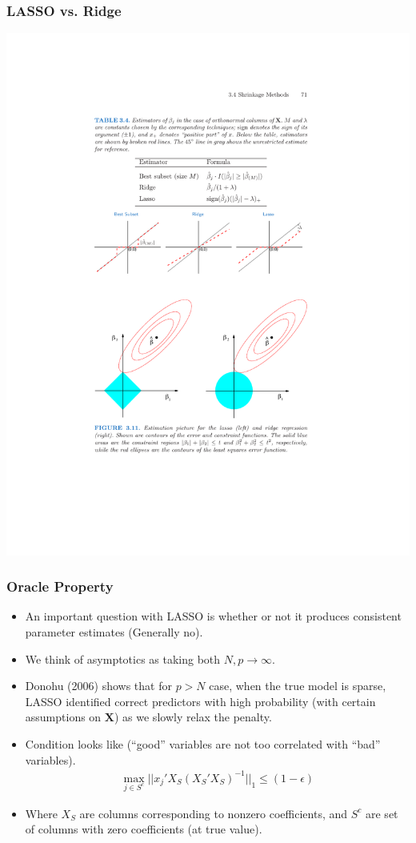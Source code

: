 \begin{frame}
\frametitle{LASSO vs. Ridge}
\begin{center}
\includegraphics[height=0.85\textheight]{./resources/orthcompare}
\end{center}
\end{frame}


\begin{frame}
    \frametitle{Oracle Property}
    \begin{itemize}
    \item An important question with LASSO is whether or not it produces consistent parameter estimates (Generally \alert{no}).
    \item We think of asymptotics as taking both $N,p\rightarrow \infty$.
    \item Donohu (2006) shows that for $p > N$ case, when the true model is sparse, LASSO identified correct predictors with high probability (with certain assumptions on $\mathbf{X}$) as we slowly relax the penalty.
    \item Condition looks like (``good'' variables are not too correlated with ``bad'' variables).
    \begin{eqnarray*}
    \max_{j \in S^{c}} || x_j' X_{S} (X_{S}' X_{S})^{-1} ||_{1} \leq (1 -\epsilon) 
    \end{eqnarray*}
    \item Where $X_{S}$ are columns corresponding to nonzero coefficients, and $S^{c}$ are set of columns with zero coefficients (at true value).
    \end{itemize}
\end{frame}


